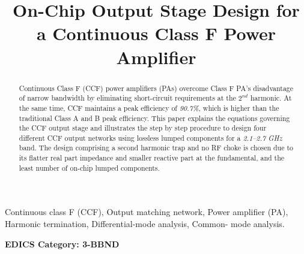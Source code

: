 \documentclass[conference]{IEEEtran}
\begin{document}
\title{On-Chip Output Stage Design for a  Continuous Class F Power Amplifier}

\author{ 
}

\maketitle

\begin{abstract}
Continuous Class F (CCF) power amplifiers (PAs) overcome Class F PA's disadvantage of narrow bandwidth by eliminating short-circuit requirements at the $2^{nd}$ harmonic. At the same time, CCF maintains a peak efficiency of \textit{90.7\%}, which is higher than the traditional Class A and B peak efficiency. This paper explains the equations governing the CCF \color{green} output stage and \color{black}  illustrates the step by step procedure to design four different \color{green} CCF \color{black}  output networks using lossless lumped components for a \textit{2.1--2.7 GHz} band.
The design comprising a second harmonic trap and no RF choke is chosen \color{blue} due to its \color{black} flatter real part impedance \color{blue} and \color{black} smaller reactive part at the \color{blue} fundamental, \color{black} and  the least number of on-chip lumped components.
\end{abstract}

\vspace{1mm}
\begin{IEEEkeywords}
Continuous class F (CCF), Output matching network, Power amplifier (PA), Harmonic termination, Differential\color{green}-\color{black}mode analysis, Common\color{green}-\color{black} mode analysis. 
\end{IEEEkeywords}


\ifCLASSOPTIONpeerreview
\begin{center} \bfseries EDICS Category: 3-BBND \end{center}
\fi
\end{document}
